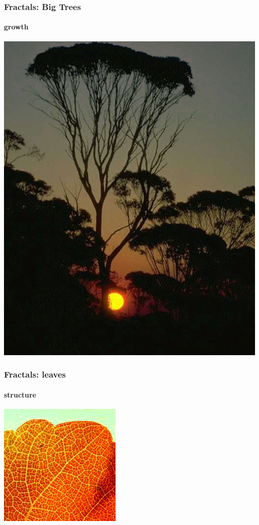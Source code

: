 \documentclass[10pt]{beamer}
\begin{document}
\begin{frame}
\frametitle{Fractals: Big Trees}
\framesubtitle{growth}
\begin{center}
\includegraphics[height=0.9\textheight]{figs/fractal12}
\end{center}
\end{frame}
\begin{frame}
\frametitle{Fractals: leaves}
\framesubtitle{structure}
\begin{center}
\includegraphics[height=0.9\textheight]{figs/fractal13}
\end{center}
\end{frame}
\end{document}
